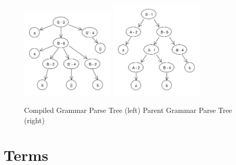 \documentclass[11pt]{article}
\begin{document}
\begin{figure}[h!]
    \centering
    \includegraphics[width=0.4\textwidth,natwidth=458,natheight=444]{compiled_ex.pdf}
    \includegraphics[width=0.4\textwidth,natwidth=472,natheight=500]{decompiled_ex.pdf}
    \caption{Compiled Grammar Parse Tree (left) Parent Grammar Parse Tree (right)}
    \label{fig:comp_to_dec_ex}
\end{figure}

\clearpage

\section*{Terms}
\end{document}
